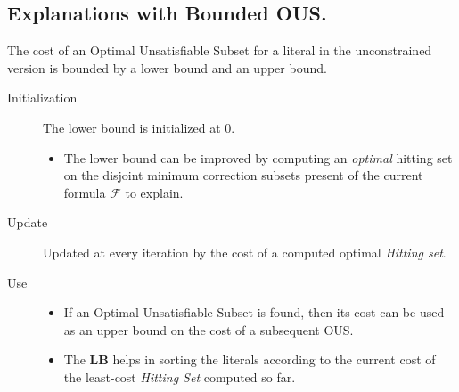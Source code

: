 \documentclass[twoside,11pt]{article}
\newcommand\m[1]{\mathcal{#1}}
\newcommand\Iend{\ensuremath{I_\mathit{end} }\xspace}
\newcommand\formula{\ensuremath{\m{F} }\xspace}
\newcommand\mm[1]{\ensuremath{#1}\xspace}
\newcommand\call[1]{\mm{\textsc{#1}}}
\newcommand\grow{\mm{\call{Grow}}}
\newcommand\maxsat{MaxSAT\xspace}
\begin{document}







\subsection{Explanations with Bounded OUS.}

The cost of an Optimal Unsatisfiable Subset for a literal in the unconstrained version is bounded by a lower bound and an upper bound. 
\begin{description}
\item[Initialization] The lower bound is initialized at 0. 
\begin{itemize}
	\item[$>$] The lower bound can be improved by computing an \emph{optimal} hitting set on the disjoint minimum correction subsets present of the current formula $\formula$ to explain.			
\end{itemize}
\item[Update] Updated at every iteration by the cost of a computed optimal \emph{Hitting set}.
\item[Use] 
\begin{itemize}
	\item[$>$] If an Optimal Unsatisfiable Subset is found, then its cost can be used as an upper bound on the cost of a subsequent OUS.
	\item[$>$] The \textbf{LB} helps in sorting the literals according to the current cost of the least-cost \emph{Hitting Set} computed so far.		
\end{itemize}
\end{description}
\end{document}
